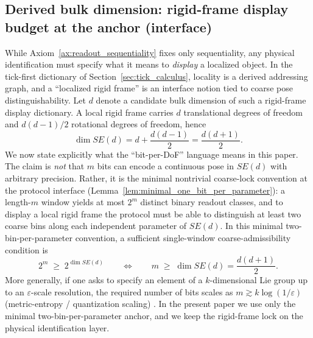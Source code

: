 \subsection{Derived bulk dimension: rigid-frame display budget at the anchor (interface)}
\label{subsec:6dof_lock}
While Axiom~\ref{ax:readout_sequentiality} fixes only sequentiality, any physical identification must specify what it means to \emph{display} a localized object.
In the tick-first dictionary of Section~\ref{sec:tick_calculus}, locality is a derived addressing graph, and a ``localized rigid frame'' is an interface notion tied to coarse pose distinguishability.
Let $d$ denote a candidate bulk dimension of such a rigid-frame display dictionary.
A local rigid frame carries $d$ translational degrees of freedom and $d(d-1)/2$ rotational degrees of freedom, hence
\[
\dim SE(d)=d+\frac{d(d-1)}{2}=\frac{d(d+1)}{2}.
\]
We now state explicitly what the ``bit-per-DoF'' language means in this paper.
The claim is \emph{not} that $m$ bits can encode a continuous pose in $SE(d)$ with arbitrary precision.
Rather, it is the minimal nontrivial coarse-lock convention at the protocol interface (Lemma~\ref{lem:minimal_one_bit_per_parameter}): a length-$m$ window yields at most $2^m$ distinct binary readout classes, and to display a local rigid frame the protocol must be able to distinguish at least two coarse bins along each independent parameter of $SE(d)$.
In this minimal two-bin-per-parameter convention, a sufficient single-window coarse-admissibility condition is
\[
2^m\;\ge\;2^{\dim SE(d)}
\qquad\Longleftrightarrow\qquad
m\;\ge\;\dim SE(d)=\frac{d(d+1)}{2}.
\]
More generally, if one asks to specify an element of a $k$-dimensional Lie group up to an $\varepsilon$-scale resolution, the required number of bits scales as $m\gtrsim k\log(1/\varepsilon)$ (metric-entropy / quantization scaling) \cite{GrayNeuhoff1998Quantization,CoverThomas2006}.
In the present paper we use only the minimal two-bin-per-parameter anchor, and we keep the rigid-frame lock on the physical identification layer.
